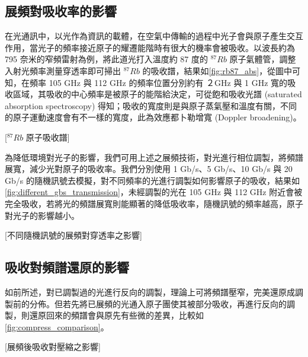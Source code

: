 \documentclass[class=NCU_thesis, crop=false]{standalone}
\begin{document}
\subsection{展頻對吸收率的影響}
在光通訊中，以光作為資訊的載體，在空氣中傳輸的過程中光子會與原子產生交互作用，當光子的頻率接近原子的耀遷能階時有很大的機率會被吸收。以波長約為 795 奈米的窄頻雷射為例，將此道光打入溫度約 87 度的 $^{87}Rb$ 原子氣體管，調整入射光頻率測量穿透率即可掃出 $^{87}Rb$ 的吸收譜，結果如\cref{fig:rb87_abs}，從圖中可知，在頻率 105 GHz 與 112 GHz 的頻率位置分別約有 ２GHz 與 1 GHz 寬的吸收區域，其吸收的中心頻率是被原子的能階給決定，可從飽和吸收光譜 (saturated absorption spectroscopy) 得知；吸收的寬度則是與原子蒸氣壓和溫度有關，不同的原子運動速度會有不一樣的寬度，此為效應都卜勒增寬 (Doppler broadening)。

[$^{87}Rb$ 原子吸收譜]

為降低環境對光子的影響，我們可用上述之展頻技術，對光進行相位調製，將頻譜展寬，減少光對原子的吸收率。我們分別使用 1 Gb/s、5 Gb/s、10 Gb/s 與 20 Gb/s 的隨機訊號去模擬，對不同頻率的光進行調製如何影響原子的吸收，結果如\cref{fig:different_gbs_transmission}，未經調製的光在 105 GHz 與 112 GHz 附近會被完全吸收，若將光的頻譜展寬則能顯著的降低吸收率，隨機訊號的頻率越高，原子對光子的影響越小。

[不同隨機訊號的展頻對穿透率之影響]

\subsection{吸收對頻譜還原的影響}
如前所述，對已調製過的光進行反向的調製，理論上可將頻譜壓窄，完美還原成調製前的分佈。但若先將已展頻的光通入原子團使其被部分吸收，再進行反向的調製，則還原回來的頻譜會與原先有些微的差異，比較如\cref{fig:compress_comparison}。

[展頻後吸收對壓縮之影響]
\end{document}
